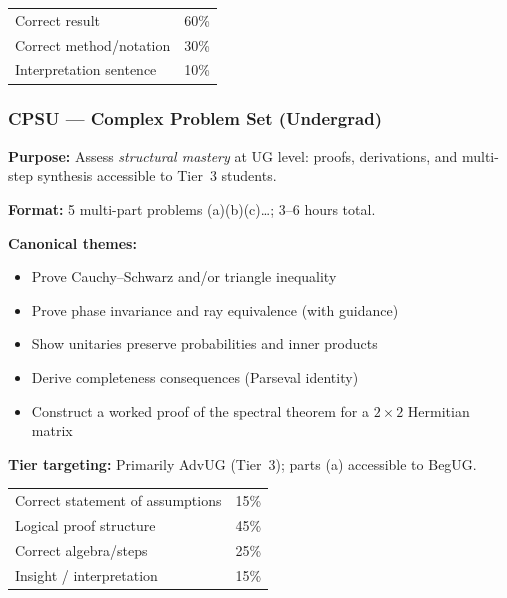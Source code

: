 \documentclass[11pt,a4paper]{article}
\begin{document}
\begin{tcolorbox}[rubricbox, title={SPSU Rubric (per problem)}]
\begin{tabular}{ll}
  Correct result           & 60\%\\
  Correct method/notation  & 30\%\\
  Interpretation sentence  & 10\%\\
\end{tabular}
\end{tcolorbox}

\bigskip
\subsubsection{CPSU --- Complex Problem Set (Undergrad)}

\begin{tcolorbox}[ugprobbox, title={CPSU --- Complex Problem Set, Undergraduate \hfill\normalfont 5 problems}]

\textbf{Purpose:} Assess \emph{structural mastery} at UG level: proofs, derivations,
and multi-step synthesis accessible to Tier~3 students.

\medskip\textbf{Format:} 5 multi-part problems (a)(b)(c)\ldots; 3--6 hours total.

\medskip\textbf{Canonical themes:}
\begin{itemize}[leftmargin=1.5em,itemsep=2pt]
  \item Prove Cauchy--Schwarz and/or triangle inequality
  \item Prove phase invariance and ray equivalence (with guidance)
  \item Show unitaries preserve probabilities and inner products
  \item Derive completeness consequences (Parseval identity)
  \item Construct a worked proof of the spectral theorem for a $2\times 2$ Hermitian matrix
\end{itemize}

\medskip\textbf{Tier targeting:} Primarily AdvUG (Tier~3); parts (a) accessible to BegUG.
\end{tcolorbox}

\begin{tcolorbox}[rubricbox, title={CPSU Rubric (per problem)}]
\begin{tabular}{ll}
  Correct statement of assumptions & 15\%\\
  Logical proof structure           & 45\%\\
  Correct algebra/steps             & 25\%\\
  Insight / interpretation          & 15\%\\
\end{tabular}
\end{tcolorbox}
\end{document}
